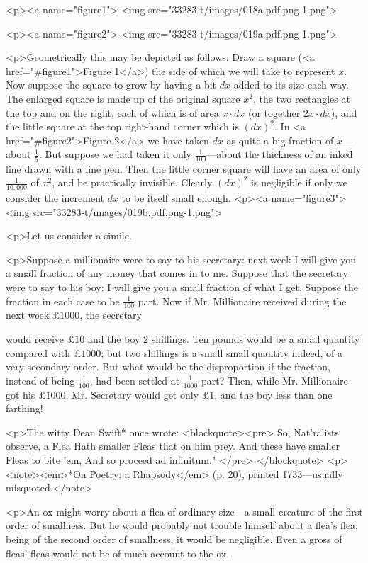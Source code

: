 \documentclass{ximera}
\begin{document}
<p><a name="figure1">
<img src="33283-t/images/018a.pdf.png-1.png">

<p><a name="figure2">
<img src="33283-t/images/019a.pdf.png-1.png">


<p>Geometrically this may be depicted as follows:
Draw a square (<a href="#figure1">Figure 1</a>) the side of which we will
take to represent $x$. Now suppose the square to
grow by having a bit $dx$ added to its size each
way. The enlarged square is made up of the original
square $x^2$, the two rectangles at the top and on the
right, each of which is of area $x · dx$ (or together
$2x · dx$), and the little square at the top right-hand
corner which is $(dx)^2$. In <a href="#figure2">Figure 2</a> we have taken $dx$ as
quite a big fraction of $x$---about $\frac{1}{5}$. But suppose we
had taken it only $\frac{1}{100}$---about the thickness of an
inked line drawn with a fine pen. Then the little
corner square will have an area of only $\frac{1}{10,000}$ of $x^2$,
and be practically invisible. Clearly $(dx)^2$ is negligible
if only we consider the increment $dx$ to be itself
small enough.
<p><a name="figure3">
<img src="33283-t/images/019b.pdf.png-1.png">

<p>Let us consider a simile.

<p>Suppose a millionaire were to say to his secretary:
next week I will give you a small fraction of any
money that comes in to me. Suppose that the
secretary were to say to his boy: I will give you a
small fraction of what I get. Suppose the fraction
in each case to be $\frac{1}{100}$ part. Now if Mr. Millionaire
received during the next week £$1000$, the secretary

would receive £$10$ and the boy $2$ shillings. Ten
pounds would be a small quantity compared with
£$1000$; but two shillings is a small small quantity
indeed, of a very secondary order. But what would
be the disproportion if the fraction, instead of being $\frac{1}{100}$,
had been settled at $\frac{1}{1000}$ part? Then, while
Mr. Millionaire got his £$1000$, Mr. Secretary would
get only £$1$, and the boy less than one farthing!

<p>The witty Dean Swift*
once wrote:
<blockquote><pre>
So, Nat'ralists observe, a Flea
Hath smaller Fleas that on him prey.
And these have smaller Fleas to bite 'em,
And so proceed ad infinitum." </pre>
</blockquote>
  <p><note><em>*On Poetry: a Rhapsody</em> (p. 20), printed 1733---usually misquoted.</note>

<p>An ox might worry about a flea of ordinary
size---a small creature of the first order of smallness.
But he would probably not trouble himself about a
flea's flea; being of the second order of smallness, it
would be negligible. Even a gross of fleas' fleas
would not be of much account to the ox.
\end{document}

